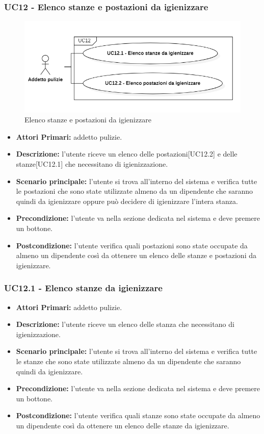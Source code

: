 \subsubsection{ UC12 - Elenco stanze e postazioni da igienizzare}
\begin{figure}[H]
		\centering
		\includegraphics[width=15cm]{res/images/UC12.png}
		\caption{Elenco stanze e postazioni da igienizzare}
		\label{fig:Elenco stanze e postazioni da igienizzare}
	\end{figure}
\begin{itemize}
           	\item\textbf{Attori Primari:} addetto pulizie.
           	\item\textbf{Descrizione:} l'utente riceve un elenco delle postazioni[UC12.2] e delle stanze[UC12.1] che necessitano di igienizzazione.
           	\item\textbf{Scenario principale:} l'utente si trova all'interno del sistema e verifica tutte le postazioni che sono state utilizzate almeno da un dipendente che saranno quindi da igienizzare oppure può decidere di igienizzare l’intera stanza.
           	\item\textbf{Precondizione:} l'utente va nella sezione dedicata nel sistema e deve premere un bottone.
           	\item\textbf{Postcondizione:} l'utente verifica quali postazioni sono state occupate da almeno un dipendente così da ottenere un elenco delle stanze e postazioni da igienizzare.
\end{itemize}

\subsubsection{UC12.1 - Elenco stanze da igienizzare}
\begin{itemize}
           	\item\textbf{Attori Primari:} addetto pulizie.
           	\item\textbf{Descrizione:} l'utente riceve un elenco delle stanza che necessitano di igienizzazione.
           	\item\textbf{Scenario principale:} l'utente si trova all'interno del sistema e verifica tutte le stanze che sono state utilizzate almeno da un dipendente 				che saranno quindi da igienizzare.
           	\item\textbf{Precondizione:} l'utente va nella sezione dedicata nel sistema e deve premere un bottone.
           	\item\textbf{Postcondizione:} l'utente verifica quali stanze sono state occupate da almeno un dipendente così da ottenere un elenco delle stanze da 				igienizzare.
\end{itemize}
